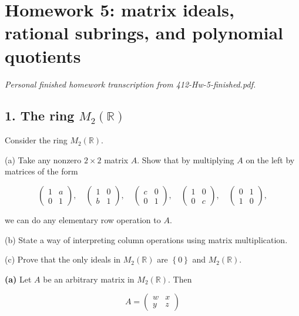 \chapter{Homework 5: matrix ideals, rational subrings, and polynomial quotients}

\emph{Personal finished homework transcription from 412-Hw-5-finished.pdf.}

\section{\texorpdfstring{1. The ring \(M_{2}\left( \mathbb{R} \right)\)}{1. The ring M\_\{2\}\textbackslash left( \textbackslash mathbb\{R\} \textbackslash right)}}

Consider the ring \(M_{2}\left( \mathbb{R} \right)\).

(a) Take any nonzero \(2 \times 2\) matrix \(A\). Show that by multiplying \(A\) on the left by matrices of the form

\[\begin{pmatrix}
1 & a \\
0 & 1
\end{pmatrix},\quad\begin{pmatrix}
1 & 0 \\
b & 1
\end{pmatrix},\quad\begin{pmatrix}
c & 0 \\
0 & 1
\end{pmatrix},\quad\begin{pmatrix}
1 & 0 \\
0 & c
\end{pmatrix},\quad\begin{pmatrix}
0 & 1 \\
1 & 0
\end{pmatrix},\]

we can do any elementary row operation to \(A\).

(b) State a way of interpreting column operations using matrix multiplication.

(c) Prove that the only ideals in \(M_{2}\left( \mathbb{R} \right)\) are \(\left\{ 0 \right\}\) and \(M_{2}\left( \mathbb{R} \right)\).

\textbf{(a)} Let \(A\) be an arbitrary matrix in \(M_{2}\left( \mathbb{R} \right)\). Then

\[A = \begin{pmatrix}
w & x \\
y & z
\end{pmatrix}\]

